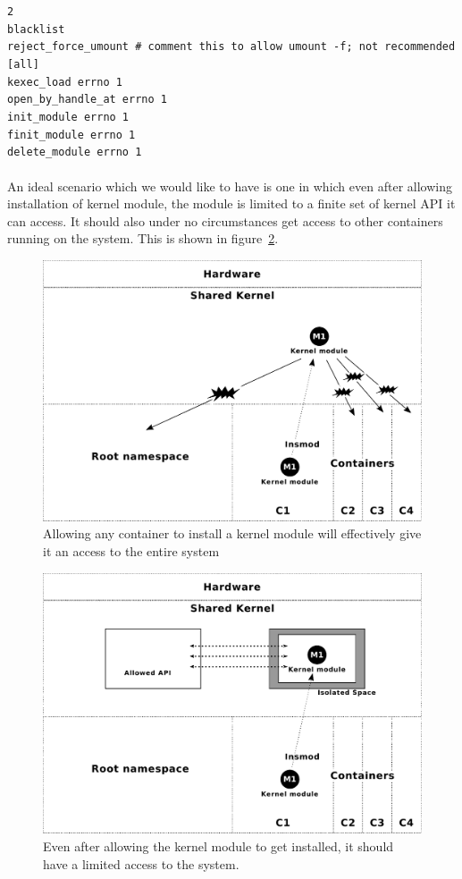 \documentclass[twoside]{iitbreport}
\begin{document}
\texttt{2\\
blacklist\\
reject\_force\_umount  \# comment this to allow umount -f;  not recommended
[all]\\
kexec\_load errno 1\\
open\_by\_handle\_at errno 1\\
init\_module errno 1\\
finit\_module errno 1\\
delete\_module errno 1
}
\\
\\
An ideal scenario which we would like to have is one in which even after allowing installation of kernel module, the module is limited to a finite set of kernel API it can access. It should also under no circumstances get access to other containers running on the system. This is shown in figure~\ref{fig:ideal1}.

\begin{figure}[ht]
\centering
\includegraphics[width=\textwidth]{problem}
\caption{Allowing any container to install a kernel module will effectively give it an access to the entire system\label{fig:problem1}}
\end{figure}

\begin{figure}[ht]
\centering
\includegraphics[width=\textwidth]{ideal}
\caption{Even after allowing the kernel module to get installed, it should have a limited access to the system.\label{fig:ideal1}}
\end{figure}
\end{document}
